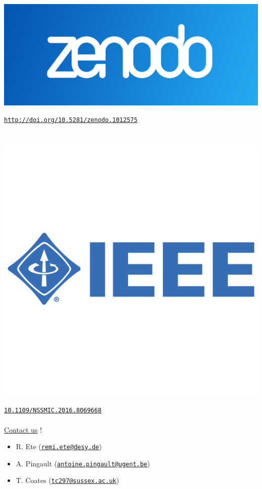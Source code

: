 \documentclass[presentation, 10pt]{beamer}
\begin{document}
\begin{frame}
  \vspace*{0.1cm}
  ~~~
  \begin{minipage}{0.05\linewidth}
    \includegraphics[width=\linewidth]{figs/zenodo-logo.png}
  \end{minipage}
  \href{http://doi.org/10.5281/zenodo.1012575}{\tt http://doi.org/10.5281/zenodo.1012575} \\
  ~~~
  \begin{minipage}{0.05\linewidth}
    \includegraphics[width=\linewidth]{figs/ieee-logo.png}
  \end{minipage}
  \href{https://doi.org/10.1109/NSSMIC.2016.8069668}{\tt 10.1109/NSSMIC.2016.8069668} \\  
  ~\\
  \underline{Contact us} !
  \begin{itemize}
    \scriptsize
    \item R. Ete (\href{mailto:remi.ete@desy.de}{\tt remi.ete@desy.de}) 
    \item A. Pingault (\href{mailto:antoine.pingault@ugent.be}{\tt antoine.pingault@ugent.be})
    \item T. Coates (\href{mailto:tc297@sussex.ac.uk}{\tt tc297@sussex.ac.uk})
  \end{itemize}
\end{frame}
\end{document}
